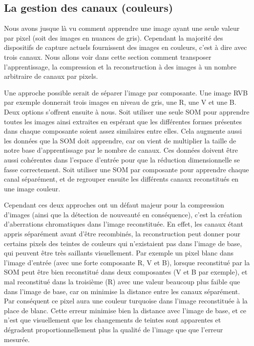 	\subsection{La gestion des canaux (couleurs)}\label{sec:img:colors}

	Nous avons jusque là vu comment apprendre une image ayant une seule valeur par pixel (soit des images en nuances de gris). Cependant la majorité des dispositifs de capture actuels fournissent des images en couleurs, c'est à dire avec trois canaux. Nous allons voir dans cette section comment transposer l'apprentissage, la compression et la reconstruction à des images à un nombre arbitraire de canaux par pixels.

	Une approche possible serait de séparer l'image par composante. Une image RVB par exemple donnerait trois images en niveau de gris, une R, une V et une B. Deux options s'offrent ensuite à nous. Soit utiliser une seule SOM pour apprendre toutes les images ainsi extraites en espérant que les différentes formes présentes dans chaque composante soient assez similaires entre elles. Cela augmente aussi les données que la SOM doit apprendre, car on vient de multiplier la taille de notre base d'apprentissage par le nombre de canaux. Ces données doivent être aussi cohérentes dans l'espace d'entrée pour que la réduction dimensionnelle se fasse correctement. Soit utiliser une SOM par composante pour apprendre chaque canal séparément, et de regrouper ensuite les différents canaux reconstitués en une image couleur. 
	
	Cependant ces deux approches ont un défaut majeur pour la compression d'images (ainsi que la détection de nouveauté en conséquence), c'est la création d'aberrations chromatiques dans l'image reconstituée. En effet, les canaux étant appris séparément avant d'être recombinés, la reconstruction peut donner pour certains pixels des teintes de couleurs qui n'existaient pas dans l'image de base, qui peuvent être très saillants visuellement. Par exemple un pixel blanc dans l'image d'entrée (avec une forte composante R, V et B), lorsque reconstitué par la SOM peut être bien reconstitué dans deux composantes (V et B par exemple), et mal reconstitué dans la troisième (R) avec une valeur beaucoup plus faible que dans l'image de base, car on minimise la distance entre les canaux séparément. Par conséquent ce pixel aura une couleur turquoise dans l'image reconstituée à la place de blanc. Cette erreur minimise bien la distance avec l'image de base, et ce n'est que visuellement que les changements de teintes sont apparentes et dégradent proportionnellement plus la qualité de l'image que que l'erreur mesurée.

